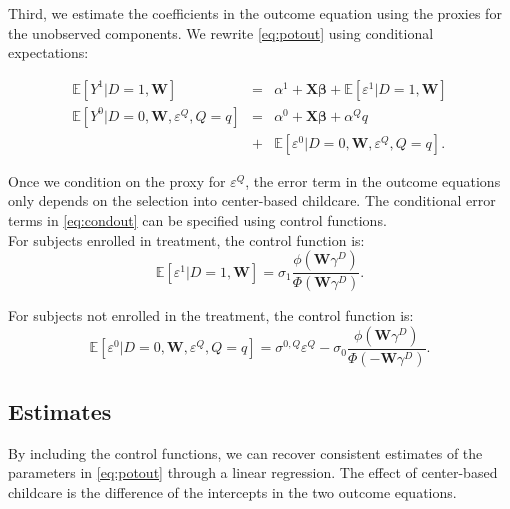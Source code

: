 \noindent Third, we estimate the coefficients in the outcome equation using the proxies for the unobserved components. We rewrite \eqref{eq:potout} using conditional expectations:

\begin{eqnarray}
\mathbb{E}\left[Y^1|D=1,\mathbf{W}\right]                         &=& \alpha^1+\mathbf{X}\mathbf{\beta}              +\mathbb{E}\left[\varepsilon^1|D=1,\mathbf{W}      \right] \nonumber \\
\mathbb{E}\left[Y^0|D=0,\mathbf{W},\varepsilon^{Q},Q=q\right] &=& \alpha^0+\mathbf{X}\mathbf{\beta} +\alpha^Q q \label{eq:condout} \\ \nonumber &+& \mathbb{E}\left[\varepsilon^0|D=0,\mathbf{W},\varepsilon^{Q},Q=q\right].
\end{eqnarray}

\noindent Once we condition on the proxy for $\varepsilon^{Q}$, the error term in the outcome equations only depends on the selection into center-based childcare. The conditional error terms in \eqref{eq:condout} can be specified using control functions.\\

\noindent For subjects enrolled in treatment, the control function is:
\begin{equation}
\mathbb{E} \left[\varepsilon^1|D=1,\mathbf{W} \right]=\sigma_1\frac{\phi \left( \mathbf{W} \gamma^D \right) }{ \Phi \left( \mathbf{W} \gamma^D \right) }. \label{eq:contam}
\end{equation}

\noindent For subjects not enrolled in the treatment, the control function is:
\begin{equation}
\mathbb{E} \left[\varepsilon^0|D=0,\mathbf{W},\varepsilon^{Q},Q=q\right]= \sigma^{0,Q}\varepsilon^{Q} - \sigma_0 \frac{\phi\left(\mathbf{W}\gamma^D\right)}{\Phi\left( - \mathbf{W} \gamma^D \right) }. \label{eq:home}
\end{equation}

\subsection{Estimates}

\noindent By including the control functions, we can recover consistent estimates of the parameters in \eqref{eq:potout} through a linear regression. The effect of center-based childcare is the difference of the intercepts in the two outcome equations.\\

